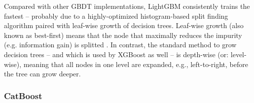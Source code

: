 Compared with other GBDT implementations, LightGBM consistently trains the fastest \parencite[1951--1954]{bentejac_comparative_2021} -- probably due to a highly-optimized histogram-based split finding algorithm paired with leaf-wise growth of decision trees. Leaf-wise growth (also known as best-first) means that the node that maximally reduces the impurity (e.g. information gain) is splitted \parencite[3]{shi_best-first_2007}. In contrast, the standard method to grow decision trees -- and which is used by XGBoost as well -- is depth-wise (or: level-wise), meaning that all nodes in one level are expanded, e.g., left-to-right, before the tree can grow deeper. 

\subsubsection{CatBoost}

